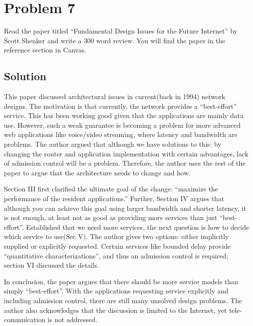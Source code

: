 
\section*{Problem 7}

Read the paper titled ``Fundamental Design Issues for the Future Internet'' by Scott Shenker and write a 300
word review.
You will find the paper in the reference section in Canvas.

\subsection*{Solution}


This paper discussed architectural issues in current(back in 1994) network designs.
The motivation is that currently, the network provides a ``best-effort'' service.
This has been working good given that the applications are mainly data use.
However, such a weak guarantee is becoming a problem for more advanced web applications like voice/video streaming, where latency and bandwidth are problems.
The author argued that although we have solutions to this: by changing the router and application implementation with certain advantages, lack of admission control will be a problem.
Therefore, the author uses the rest of the paper to argue that the architecture needs to change and how.

Section III first clarified the ultimate goal of the change: ``maximize the performance of the resident applications.''
Further, Section IV argues that although you can achieve this goal using larger bandwidth and shorter latency, it is not enough, at least not as good as providing more services than just ``best-effort''.
Established that we need more services, the next question is how to decide which service to use(Sec V). The author gives two options: either implicitly supplied or explicitly requested.
Certain services like bounded delay provide ``quantitative characterizations'', and thus an admission control is required; section VI discussed the details.

In conclusion, the paper argues that there should be more service models than simply ``best-effort''.
With the applications requesting service explicitly and including admission control, there are still many unsolved design problems.
The author also acknowledges that the discussion is limited to the Internet, yet tele-commuication is not addressed.